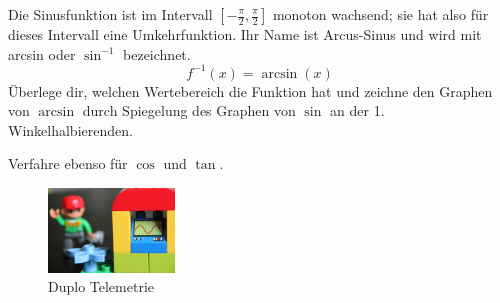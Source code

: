 \documentclass[%
11pt,%
twoside,%
titlepage,%
german,%
headsepline%
]{scrartcl}
\begin{document}

\begin{ueb}[ArcSin]
Die Sinusfunktion ist im Intervall $[-\frac{\pi}{2},\frac{\pi}{2}]$ monoton wachsend; sie hat also für dieses Intervall eine Umkehrfunktion. Ihr Name ist Arcus-Sinus und wird mit arcsin oder $\sin^{-1}$ bezeichnet.
$$f^{-1}(x)=\arcsin(x)$$
Überlege dir, welchen Wertebereich die Funktion hat und zeichne den Graphen von $\arcsin$ durch Spiegelung des Graphen von $\sin$ an der 1. Winkelhalbierenden.

\noindent Verfahre ebenso für $\cos$ und $\tan$.
\end{ueb}

\begin{figure}
\begin{center}
\includegraphics[width=0.3\textwidth]{pictures/telemetrie}
\end{center}
\caption{Duplo Telemetrie}
\end{figure}
\end{document}
